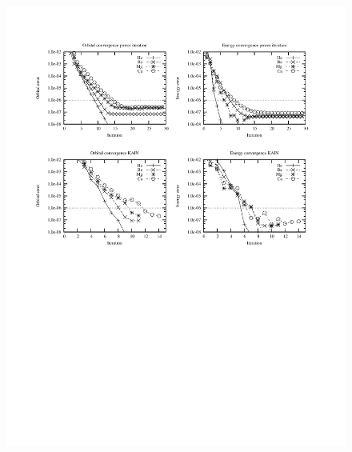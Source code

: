 \begin{frame}
\begin{columns}
\begin{column}[b]{0.45\textwidth}
\begin{figure}
	\includegraphics[scale=0.5, clip, viewport = 300 550 550 740]
                {figures/accuracy.pdf}
    \end{figure}

    \end{column}
    \end{columns}
\end{frame}


